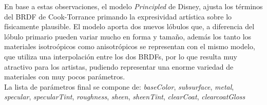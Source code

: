     En base a estas observaciones, el modelo \textit{Principled} de Disney, ajusta los t\'erminos del BRDF de Cook-Torrance \autocite{cooktorrance}
    primando la expresividad art\'istica sobre lo f\'isicamente plausible. El modelo aporta dos nuevos l\'obulos que, a diferencia del l\'obulo
    primario pueden variar mucho en forma y tama\~no, adem\'as los tanto los materiales isotro\'opicos como anisotr\'opicos
    se representan con el mismo modelo, que utiliza una interpolaci\'on entre los dos BRDFs, por lo que resulta muy atractivo para los artistas,
    pudiendo representar una enorme variedad de materiales con muy pocos par\'ametros.\\

    La lista de par\'ametros final se compone de: \textit{baseColor}, \textit{subsurface}, \textit{metal}, \textit{specular}, \textit{specularTint},
    \textit{roughness}, \textit{sheen}, \textit{sheenTint}, \textit{clearCoat}, \textit{clearcoatGloss}
    
    
    

